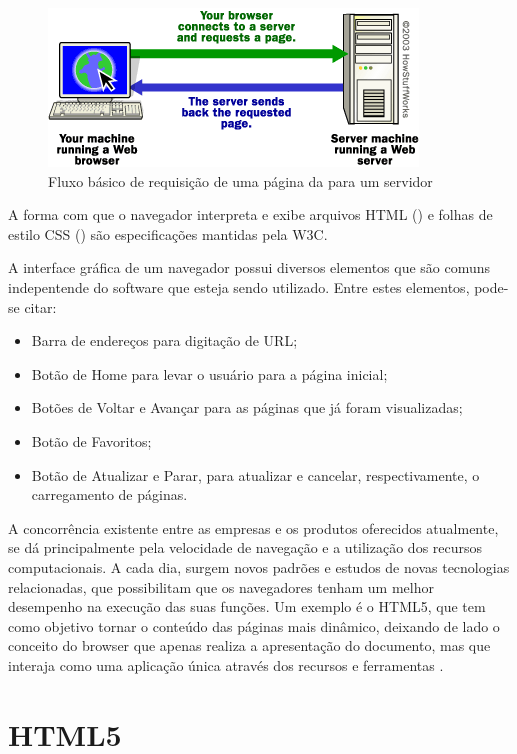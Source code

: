 \documentclass[espaco=simples,appendix=Name]{abnt}
\begin{document}
\begin{figure}[h]
  \centering
    \includegraphics[scale=1]{web_basic.png}
  \caption{Fluxo básico de requisição de uma página da  para um servidor \protect\cite{BrowserStats}}
\end{figure}
 
A forma com que o navegador interpreta e exibe arquivos HTML () e folhas de estilo CSS () são especificações mantidas pela W3C.

A interface gráfica de um navegador possui diversos elementos que são comuns indepentende do software que esteja sendo utilizado. Entre estes elementos, pode-se citar: 
\begin{itemize}
	\item Barra de endereços para digitação de URL;
	\item Botão de Home para levar o usuário para a página inicial;
	\item Botões de Voltar e Avançar para as páginas que já foram visualizadas;
	\item Botão de Favoritos;
	\item Botão de Atualizar e Parar, para atualizar e cancelar, respectivamente, o carregamento de páginas.
\end{itemize}

A concorrência existente entre as empresas e os produtos oferecidos atualmente, se dá principalmente pela velocidade de navegação e a utilização dos recursos computacionais. A cada dia, surgem novos padrões e estudos de novas tecnologias relacionadas, que possibilitam que os navegadores tenham um melhor desempenho na execução das suas funções. Um exemplo é o HTML5, que tem como objetivo tornar o conteúdo das páginas mais dinâmico, deixando de lado o conceito do browser que apenas realiza a apresentação do documento, mas que interaja como uma aplicação única através dos recursos e ferramentas \cite{WebAppPlataform}.

\section{HTML5}
\end{document}
